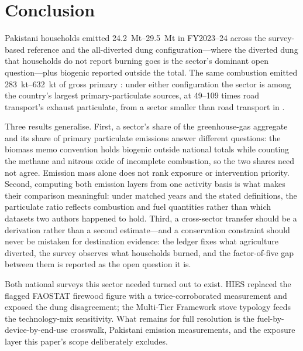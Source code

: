 \section{Conclusion}
\label{sec:conclusion}

Pakistani households emitted \SIrange{24.2}{29.5}{\mega\tonne} \COe{} in FY2023--24
across the survey-based reference and the all-diverted dung configuration---where the
diverted dung that households do not report burning goes is the sector's dominant open
question---plus biogenic \COtwo{} reported
outside the total. The same combustion emitted \SIrange{283}{632}{\kilo\tonne} of gross
primary \PM{}: under either configuration the sector is among the country's largest
primary-particulate sources, at \numrange{49}{109} times road transport's
exhaust particulate, from a sector smaller than road transport in \COe{}.

Three results generalise. First, a sector's share of the greenhouse-gas aggregate and its
share of primary particulate emissions answer different questions: the biomass memo
convention holds biogenic \COtwo{} outside national totals while counting the methane and
nitrous oxide of incomplete combustion, so the two shares need not agree. Emission mass alone
does not rank exposure or intervention priority. Second, computing both emission layers from one
activity basis is what makes their comparison meaningful: under matched years and the
stated definitions, the particulate ratio reflects combustion and fuel quantities
rather than which datasets two authors happened to hold. Third, a cross-sector
transfer should be a derivation rather than a second estimate---and a conservation
constraint should never be mistaken for destination evidence: the ledger fixes what
agriculture diverted, the survey observes what households burned, and the
factor-of-five gap between them is reported as the open question it is.

Both national surveys this sector needed turned out to exist. HIES replaced the
flagged FAOSTAT firewood figure with a twice-corroborated measurement and exposed the
dung disagreement; the Multi-Tier Framework stove typology \citep{worldbank2024mtf}
feeds the technology-mix sensitivity. What remains for full resolution is the
fuel-by-device-by-end-use crosswalk, Pakistani emission measurements, and the exposure
layer this paper's scope deliberately excludes.
